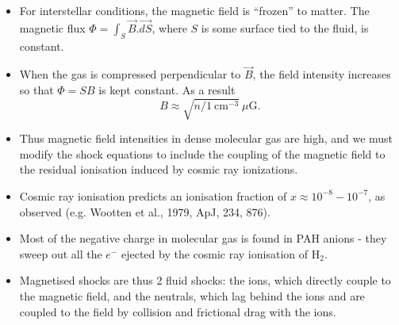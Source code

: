 \begin{itemize}

\item For interstellar conditions, the magnetic field is ``frozen'' to
  matter.  The magnetic flux $\Phi = \int_S \vec{B}.\vec{dS}$, where
  $S$ is some surface tied to the fluid, is constant.

\item When the gas is compressed perpendicular to $\vec{B}$, the field
  intensity increases so that $ \Phi = S B$ is kept constant. As a
  result \begin{equation} B \approx
    \sqrt{n/1~\mathrm{cm}^{-3}}~\mu\mathrm{G} .\label{eq:Bscale} \end{equation}

\item Thus magnetic field intensities in dense molecular gas are high,
  and we must modify the shock equations to include the coupling of
  the magnetic field to the residual ionisation induced by cosmic ray
  ionizations. 

\end{itemize}




\begin{itemize}

\item Cosmic ray ionisation predicts an ionisation fraction of $x
  \approx 10^{-8}- 10^{-7}$, as observed (e.g. Wootten et al., 1979,
  ApJ, 234, 876).

\item Most of the negative charge in molecular gas is found in PAH
  anions - they sweep out all the $e^-$ ejected by the cosmic ray
  ionisation of H$_2$. 

\item Magnetised shocks are thus 2 fluid shocks: the ions, which
  directly couple to the magnetic field, and the neutrals, which lag
  behind the ions and are coupled to the field by collision and
  frictional drag with the ions.

\end{itemize}



